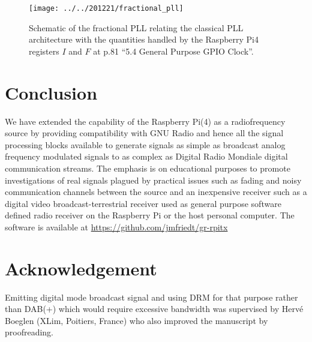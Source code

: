 \documentclass{article}
\begin{document}
\begin{figure}[h!tb]
\texttt{[image: ../../201221/fractional\_pll]}
\caption{Schematic of the fractional PLL relating the classical PLL architecture with the
quantities handled by the Raspberry Pi4 registers $I$ and $F$ 
\cite{ds} at p.81 ``5.4 General Purpose GPIO Clock''.}
\label{pll}
\end{figure}

\section{Conclusion}

We have extended the capability of the Raspberry Pi(4) as a radiofrequency source
by providing compatibility with GNU Radio and hence all the signal processing
blocks available to generate signals as simple as broadcast analog frequency
modulated signals to as complex as Digital Radio Mondiale digital communication
streams. The emphasis is on educational purposes to promote investigations of
real signals plagued by practical issues such as fading and noisy communication
channels between the source and an inexpensive receiver such as a digital video
broadcast-terrestrial receiver used as general purpose software defined radio
receiver on the Raspberry Pi or the host personal computer.
The software is available at \url{https://github.com/jmfriedt/gr-rpitx}

\section*{Acknowledgement}

Emitting digital mode broadcast signal and using DRM for that purpose rather
than DAB(+) which would require excessive bandwidth was
supervised by Herv\'e Boeglen (XLim, Poitiers, France) who also improved the 
manuscript by proofreading.



\end{document}
